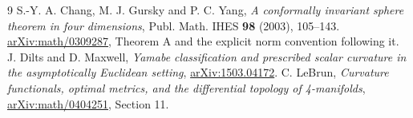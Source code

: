 \documentclass[11pt]{article}
\begin{document}
\begin{thebibliography}{9}
 S.-Y. A. Chang, M. J. Gursky and P. C. Yang,
\emph{A conformally invariant sphere theorem in four dimensions},
Publ. Math. IHES \textbf{98} (2003), 105--143.
\href{https://arxiv.org/abs/math/0309287}{arXiv:math/0309287}, Theorem A
and the explicit norm convention following it.
 J. Dilts and D. Maxwell,
\emph{Yamabe classification and prescribed scalar curvature in the
asymptotically Euclidean setting},
\href{https://arxiv.org/abs/1503.04172}{arXiv:1503.04172}.
 C. LeBrun,
\emph{Curvature functionals, optimal metrics, and the differential topology
of 4-manifolds},
\href{https://arxiv.org/abs/math/0404251}{arXiv:math/0404251}, Section 11.
\end{thebibliography}
\end{document}
